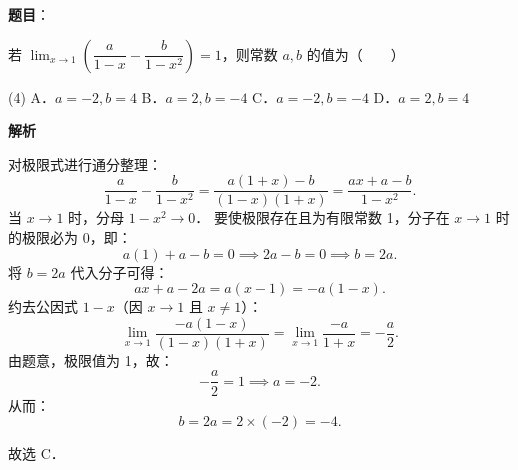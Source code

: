 \begin{answer}

\textbf{题目}：

若 $\lim_{x\to 1} \left(\dfrac{a}{1 - x} - \dfrac{b}{1 - x^2}\right) = 1$，则常数 $a, b$ 的值为\mbox{（　　）}

\begin{gkopts}(4)
\task A．$a = -2, b = 4$
\task B．$a = 2, b = -4$
\task C．$a = -2, b = -4$
\task D．$a = 2, b = 4$
\end{gkopts}

\textbf{解析}

对极限式进行通分整理：
\nopagebreak[4]
\[
\frac{a}{1 - x} - \frac{b}{1 - x^2} = \frac{a(1 + x) - b}{(1 - x)(1 + x)} = \frac{ax + a - b}{1 - x^2}.
\]
当 $x \to 1$ 时，分母 $1 - x^2 \to 0$．
要使极限存在且为有限常数 1，分子在 $x \to 1$ 时的极限必为 0，即：
\nopagebreak[4]
\[
a(1) + a - b = 0 \implies 2a - b = 0 \implies b = 2a.
\]
将 $b = 2a$ 代入分子可得：
\nopagebreak[4]
\[
ax + a - 2a = a(x - 1) = -a(1 - x).
\]
约去公因式 $1 - x$（因 $x \to 1$ 且 $x \neq 1$）：
\nopagebreak[4]
\[
\lim_{x\to 1} \frac{-a(1 - x)}{(1 - x)(1 + x)} = \lim_{x\to 1} \frac{-a}{1 + x} = -\frac{a}{2}.
\]
由题意，极限值为 1，故：
\nopagebreak[4]
\[
-\frac{a}{2} = 1 \implies a = -2.
\]
从而：
\nopagebreak[4]
\[
b = 2a = 2 \times (-2) = -4.
\]

故选 C．


\end{answer}

